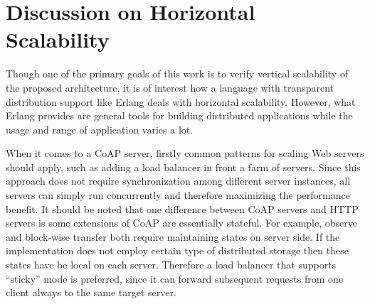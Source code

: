 


\section{Discussion on Horizontal Scalability} \label{horizontal_scale_note}

Though one of the primary goals of this work is to verify vertical scalability of the proposed architecture, it is of interest how a language with transparent distribution support like Erlang deals with horizontal scalability. However, what Erlang provides are general tools for building distributed applications while the usage and range of application varies a lot. 

When it comes to a CoAP server, firstly common patterns for scaling Web servers should apply, such as adding a load balancer in front a farm of servers. Since this approach does not require synchronization among different server instances, all servers can simply run concurrently and therefore maximizing the performance benefit. It should be noted that one difference between CoAP servers and HTTP servers is some extensions of CoAP are essentially stateful. For example, observe and block-wise transfer both require maintaining states on server side. If the implementation does not employ certain type of distributed storage then these states have be local on each server. Therefore a load balancer that supports ``sticky'' mode is preferred, since it can forward subsequent requests from one client always to the same target server. 

